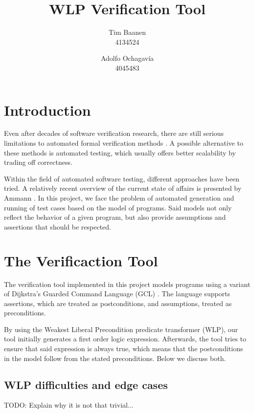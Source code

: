 \documentclass[a4paper]{article}
\author{
  Tim Baanen\\4134524
  \and
  Adolfo Ochagavía\\4045483
}
\title{WLP Verification Tool}
\begin{document}
\maketitle

\section{Introduction}

Even after decades of software verification research, there are still serious
limitations to automated formal verification methods \cite{d2008survey}. A
possible alternative to these methods is automated testing, which usually
offers better scalability by trading off correctness.

Within the field of automated software testing, different approaches have been
tried. A relatively recent overview of the current state of affairs is
presented by Ammann \cite{ammann2008introduction}. In this project, we face
the problem of automated generation and running of test cases based on the
model of programs. Said models not only reflect the behavior of a given
program, but also provide assumptions and assertions that should be respected.


\section{The Verificaction Tool}

The verification tool implemented in this project models programs using a
variant of Dijkstra's Guarded Command Language (GCL) \cite{Dijkstra:gcl}.
The language supports assertions, which are treated as postconditions,
and assumptions, treated as preconditions.

By using the Weakest Liberal Precondition predicate transformer (WLP), our
tool initially generates a first order logic expression. Afterwards, the tool
tries to ensure that said expression is always true, which means that the
postconditions in the model follow from the stated preconditions. Below we
discuss both.

\subsection{WLP difficulties and edge cases}

TODO: Explain why it is not that trivial...
\end{document}
